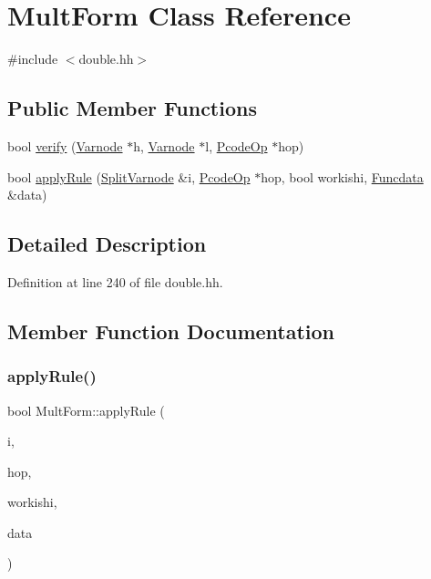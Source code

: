 \hypertarget{class_mult_form}{}\section{Mult\+Form Class Reference}
\label{class_mult_form}


{\ttfamily \#include $<$double.\+hh$>$}

\subsection*{Public Member Functions}
\begin{DoxyCompactItemize}
\item 
bool \mbox{\hyperlink{class_mult_form_a8426ce4e5ea488cb5e73a5ca2d24673e}{verify}} (\mbox{\hyperlink{class_varnode}{Varnode}} $\ast$h, \mbox{\hyperlink{class_varnode}{Varnode}} $\ast$l, \mbox{\hyperlink{class_pcode_op}{Pcode\+Op}} $\ast$hop)
\item 
bool \mbox{\hyperlink{class_mult_form_abd25691ef99e92b5dd28380932bca12d}{apply\+Rule}} (\mbox{\hyperlink{class_split_varnode}{Split\+Varnode}} \&i, \mbox{\hyperlink{class_pcode_op}{Pcode\+Op}} $\ast$hop, bool workishi, \mbox{\hyperlink{class_funcdata}{Funcdata}} \&data)
\end{DoxyCompactItemize}


\subsection{Detailed Description}


Definition at line 240 of file double.\+hh.



\subsection{Member Function Documentation}
\mbox{\label{class_mult_form_abd25691ef99e92b5dd28380932bca12d}} 
\subsubsection{\texorpdfstring{applyRule()}{applyRule()}}
{\footnotesize\ttfamily bool Mult\+Form\+::apply\+Rule (\begin{DoxyParamCaption}\item[{\mbox{\hyperlink{class_split_varnode}{Split\+Varnode}} \&}]{i,  }\item[{\mbox{\hyperlink{class_pcode_op}{Pcode\+Op}} $\ast$}]{hop,  }\item[{bool}]{workishi,  }\item[{\mbox{\hyperlink{class_funcdata}{Funcdata}} \&}]{data }\end{DoxyParamCaption})}



